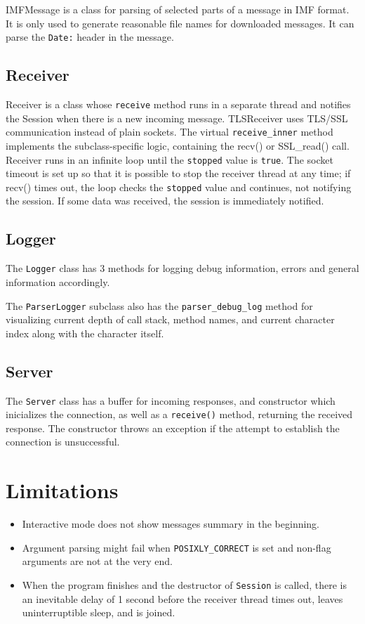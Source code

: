 \documentclass[a4]{report}
\begin{document}
IMFMessage is a class for parsing of selected parts of a message in IMF format\cite{rfc5322}. It is only used to generate reasonable file names for downloaded messages. It can parse the \texttt{Date:} header in the message.

\subsection{Receiver}

Receiver is a class whose \texttt{receive} method runs in a separate thread and notifies the Session when there is a new incoming message. TLSReceiver uses TLS/SSL communication instead of plain sockets. The virtual \texttt{receive\_inner} method implements the subclass-specific logic, containing the recv() or SSL\_read() call. Receiver runs in an infinite loop until the \texttt{stopped} value is \texttt{true}. The socket timeout is set up so that it is possible to stop the receiver thread at any time; if recv() times out, the loop checks the \texttt{stopped} value and continues, not notifying the session. If some data was received, the session is immediately notified.

\subsection{Logger}

The \texttt{Logger} class has 3 methods for logging debug information, errors and general information accordingly.

The \texttt{ParserLogger} subclass also has the \texttt{parser\_debug\_log} method for visualizing current depth of call stack, method names, and current character index along with the character itself.

\subsection{Server}

The \texttt{Server} class has a buffer for incoming responses, and constructor which inicializes the connection, as well as a \texttt{receive()} method, returning the received response. The constructor throws an exception if the attempt to establish the connection is unsuccessful.

\section{Limitations}

\begin{itemize}
  \item Interactive mode does not show messages summary in the beginning.
  \item Argument parsing might fail when \texttt{POSIXLY\_CORRECT} is set and non-flag arguments are not at the very end.
  \item When the program finishes and the destructor of \texttt{Session} is called, there is an inevitable delay of 1 second before the receiver thread times out, leaves uninterruptible sleep, and is joined.
\end{itemize}
\end{document}
